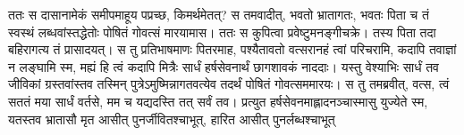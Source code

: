 \vakya ततः स दासानामेकं समीपमाहूय पप्रच्छ, किमर्थमेतत्?
\vakya स तमवादीत्, भवतो भ्रातागतः, भवतः पिता च तं स्वस्थं लब्धवांस्तद्धेतोः पोषितं गोवत्सं मारयामास।
\vakya ततः स कुपित्वा प्रवेष्टुमनङ्गीचक्रे। तस्य पिता तदा बहिरागत्य तं प्रासादयत्।
\vakya स तु प्रतिभाषमाणः पितरमाह, पश्यैतावतो वत्सरानहं त्वां परिचरामि, कदापि तवाज्ञां न लङ्घामि स्म, मह्यं हि त्वं कदापि मित्रैः सार्धं हर्षसेवनार्थं छागशावकं नाददाः।
\vakya यस्तु वेश्याभिः सार्धं तव जीविकां ग्रस्तवांस्तव तस्मिन् पुत्रेऽमुष्मिन्नागतवत्येव तदर्थं पोषितं गोवत्सममारयः।
\vakya स तु तमब्रवीत्, वत्स, त्वं सततं मया सार्धं वर्तसे, मम च यद्यदस्ति तत् सर्वं तव।
\vakya प्रत्युत हर्षसेवनमाह्लादनञ्चास्मासु युज्येते स्म, यतस्तव भ्रातासौ मृत आसीत् पुनर्जीवितश्चाभूत्, हारित आसीत् पुनर्लब्धश्चाभूत्\eoc
